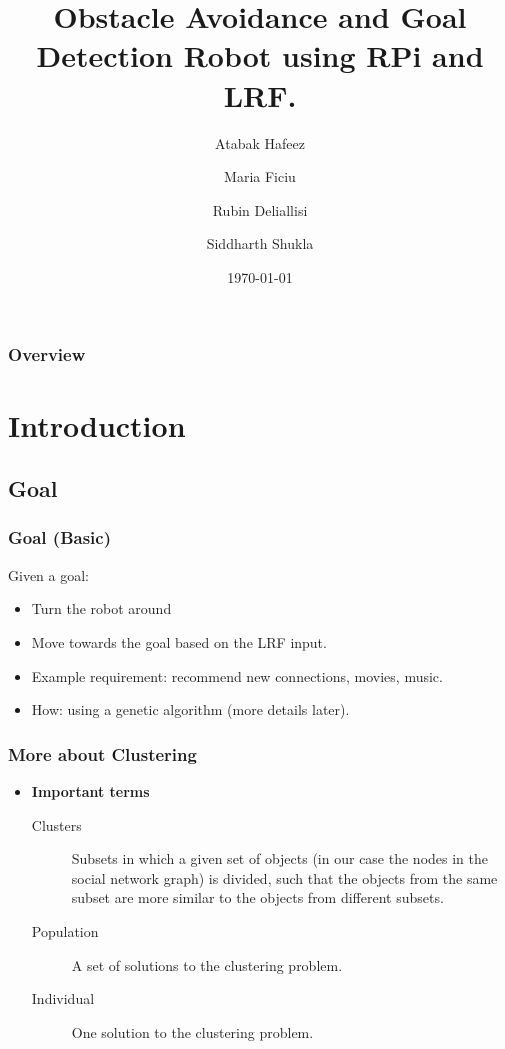 \documentclass{beamer}
\title[Design Phase]{Obstacle Avoidance and Goal Detection Robot using RPi and LRF.} %
\author{Atabak Hafeez \and
Maria Ficiu \and
Rubin Deliallisi \and
Siddharth Shukla} %
\institute[Jacobs University Bremen] %
{
Jacobs University Bremen \\ %
\medskip
}
\date{\today} %
\begin{document}
\begin{frame}
\titlepage %
\end{frame}

\begin{frame}
\frametitle{Overview} %
\tableofcontents %
\end{frame}



\section{Introduction}

\subsection{Goal}
\begin{frame}
\frametitle{Goal (Basic)}
Given a goal:
\begin{itemize}
\item Turn the robot around
\item Move towards the goal based on the LRF input.
\item Example requirement: recommend new connections, movies, music.
\item How: using a genetic algorithm (more details later).
\end{itemize}
\end{frame}

\begin{frame}
\frametitle{More about Clustering}
\begin{itemize}
\item  	\textbf{Important terms}
\begin{description}
\item[Clusters] Subsets in which a given set of objects (in our case the nodes in the social network graph) is divided, such that the objects from the same subset are more similar to the objects from different subsets.
\item[Population] A set of solutions to the clustering problem.
\item[Individual] One solution to the clustering problem.
\end{description}
\end{itemize}
\end{frame}
\end{document}
